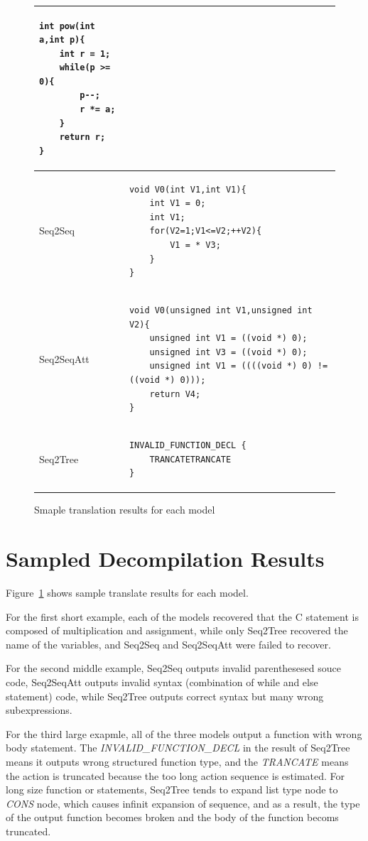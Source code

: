 \documentclass[senior,final,11pt]{iscs-thesis}
\begin{document}
\begin{figure}
\begin{tabular}{|l|l|}
		\begin{lstlisting}[style=Csample]
int pow(int a,int p){
	int r = 1;
	while(p >= 0){
		p--;
		r *= a;
	}
	return r;
}
		\end{lstlisting} \\ \hline
		Seq2Seq & 
		\begin{lstlisting}[style=Csample]
void V0(int V1,int V1){ 
	int V1 = 0; 
	int V1; 
	for(V2=1;V1<=V2;++V2){ 
		V1 = * V3; 
	} 
}
		\end{lstlisting} \\ \hline
		Seq2SeqAtt & 
		\begin{lstlisting}[style=Csample]
void V0(unsigned int V1,unsigned int V2){ 
	unsigned int V1 = ((void *) 0); 
	unsigned int V3 = ((void *) 0); 
	unsigned int V1 = ((((void *) 0) != ((void *) 0))); 
	return V4; 
}
	\end{lstlisting} \\ \hline
		Seq2Tree & 
		\begin{lstlisting}[style=Csample]
INVALID_FUNCTION_DECL { 
	TRANCATETRANCATE 
}
		\end{lstlisting}
		 \\ \hline	
	\end{tabular}
	\caption{Smaple translation results for each model}
	\label{fig:sampletranse}
\end{figure}


\section{Sampled Decompilation Results}

Figure~\ref{fig:sampletranse} shows sample translate results for each model.

For the first short example, each of the models recovered that the C statement is composed of multiplication and assignment,
while only Seq2Tree recovered the name of the variables, and Seq2Seq and Seq2SeqAtt were failed to recover.

For the second middle example, Seq2Seq outputs invalid parenthesesed souce code, Seq2SeqAtt outputs invalid syntax (combination of while and else statement) code,
while Seq2Tree outputs correct syntax but many wrong subexpressions.

For the third large exapmle, all of the three models output a function with wrong body statement.
The {\sl INVALID\_FUNCTION\_DECL} in the result of Seq2Tree means it outputs wrong structured function type, and the {\sl TRANCATE} means 
the action is truncated because the too long action sequence is estimated. 
For long size function or statements, Seq2Tree tends to expand list type node to {\sl CONS} node, which causes infinit expansion of sequence,
and as a result, the type of the output function becomes broken and the body of the function becoms truncated.
\end{document}
